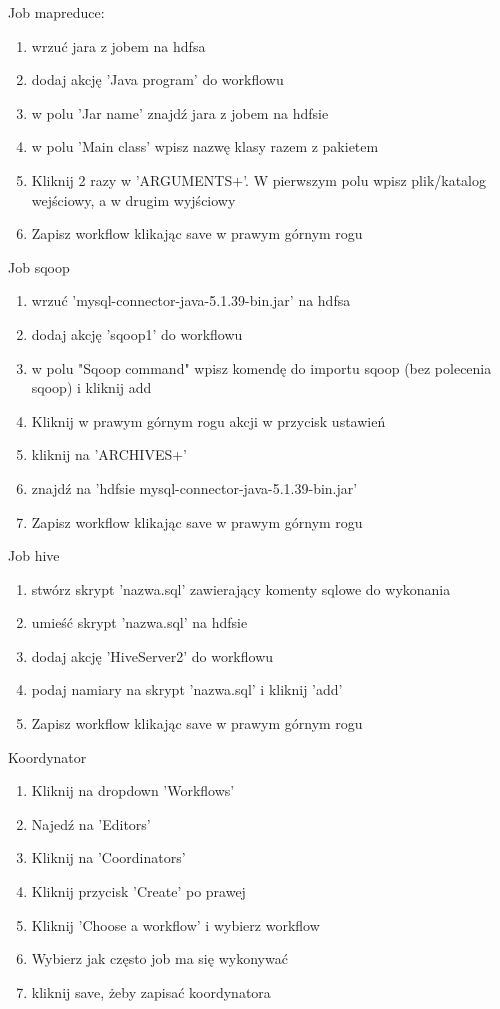 \documentclass[11pt]{article}
\begin{document}
\pagebreak

Job mapreduce:
\begin{enumerate}
\item wrzuć jara z jobem na hdfsa
\item dodaj akcję 'Java program' do workflowu
\item w polu 'Jar name' znajdź jara z jobem na hdfsie
\item w polu 'Main class' wpisz nazwę klasy razem z pakietem
\item Kliknij 2 razy w 'ARGUMENTS+'. W pierwszym polu wpisz plik/katalog wejściowy, a w drugim wyjściowy
\item Zapisz workflow klikając save w prawym górnym rogu
\end{enumerate}

\pagebreak

Job sqoop
\begin{enumerate}
\item wrzuć 'mysql-connector-java-5.1.39-bin.jar' na hdfsa
\item dodaj akcję 'sqoop1' do workflowu
\item w polu "Sqoop command" wpisz komendę do importu sqoop (bez polecenia sqoop) i kliknij add
\item Kliknij w prawym górnym rogu akcji w przycisk ustawień
\item kliknij na 'ARCHIVES+'
\item znajdź na 'hdfsie mysql-connector-java-5.1.39-bin.jar'
\item Zapisz workflow klikając save w prawym górnym rogu
\end{enumerate}

\pagebreak

Job hive
\begin{enumerate}
\item stwórz skrypt 'nazwa.sql' zawierający komenty sqlowe do wykonania
\item umieść skrypt 'nazwa.sql' na hdfsie
\item dodaj akcję 'HiveServer2' do workflowu
\item podaj namiary na skrypt 'nazwa.sql' i kliknij 'add'
\item Zapisz workflow klikając save w prawym górnym rogu
\end{enumerate}

\pagebreak

Koordynator
\begin{enumerate}
\item Kliknij na dropdown 'Workflows'
\item Najedź na 'Editors'
\item Kliknij na 'Coordinators'
\item Kliknij przycisk 'Create' po prawej
\item Kliknij 'Choose a workflow' i wybierz workflow
\item Wybierz jak często job ma się wykonywać
\item kliknij save, żeby zapisać koordynatora
\end{enumerate}
\end{document}
